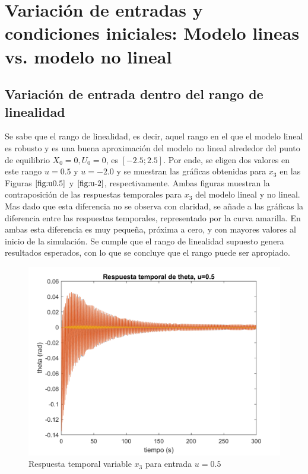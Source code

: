 \documentclass[journal]{IEEEtran}
\begin{document}
\section{Variación de entradas y condiciones iniciales: Modelo lineas vs. modelo no lineal}

\subsection{Variación de entrada dentro del rango de linealidad}

Se sabe que el rango de linealidad, es decir, aquel rango en el que el modelo lineal es robusto y es una buena aproximación del modelo no lineal alrededor del punto de equilibrio $X_0=0, U_0=0$, es $[-2.5;2.5]$. Por ende, se eligen dos valores en este rango $u = 0.5$ y $u = -2.0$ y se muestran las gráficas obtenidas para $x_3$ en las Figuras  $\ref{fig:u0.5}$ y $\ref{fig:u-2}$, respectivamente. Ambas figuras muestran la contraposición de las respuestas temporales para $x_3$ del modelo lineal y no lineal. Mas dado que esta diferencia no se observa con claridad, se añade a las gráficas la diferencia entre las respuestas temporales, representado por la curva amarilla. En ambas esta diferencia es muy pequeña, próxima a cero, y con mayores valores al inicio de la simulación. Se cumple que el rango de linealidad supuesto genera resultados esperados, con lo que se concluye que el rango puede ser apropiado.  

\begin{figure}[h!]
\caption{Respuesta temporal variable $x_3$ para entrada $u=0.5$\label{fig:u0.5}}
  \centering
\includegraphics[scale=0.19]{Graficaslvsnl/u0_5.png}
\end{figure}
\end{document}
